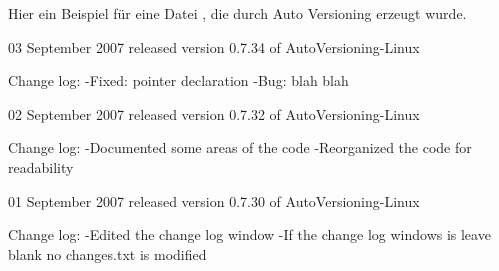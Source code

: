Hier ein Beispiel für eine Datei , die durch Auto Versioning erzeugt wurde.

\begin{code}
03 September 2007
   released version 0.7.34 of AutoVersioning-Linux

     Change log:
        -Fixed: pointer declaration
        -Bug: blah blah

02 September 2007
   released version 0.7.32 of AutoVersioning-Linux

     Change log:
        -Documented some areas of the code
        -Reorganized the code for readability

01 September 2007
   released version 0.7.30 of AutoVersioning-Linux

     Change log:
        -Edited the change log window
        -If the change log windows is leave blank no changes.txt is modified
\end{code}
